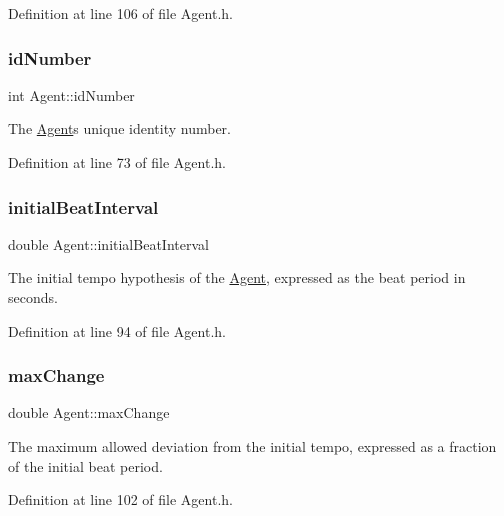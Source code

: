 Definition at line 106 of file Agent.\+h.

\mbox{\label{class_agent_ac857e9fc1a2d40aa8c488c2b0892f796}} 
\subsubsection{\texorpdfstring{id\+Number}{idNumber}}
{\footnotesize\ttfamily int Agent\+::id\+Number}

The \hyperlink{class_agent}{Agent}\textquotesingle{}s unique identity number. 

Definition at line 73 of file Agent.\+h.

\mbox{\label{class_agent_ac6cfc0361e141992752f55ad4b3671d5}} 
\subsubsection{\texorpdfstring{initial\+Beat\+Interval}{initialBeatInterval}}
{\footnotesize\ttfamily double Agent\+::initial\+Beat\+Interval}

The initial tempo hypothesis of the \hyperlink{class_agent}{Agent}, expressed as the beat period in seconds. 

Definition at line 94 of file Agent.\+h.

\mbox{\label{class_agent_a5aa8ad248a3aceecec676b89a0eb3791}} 
\subsubsection{\texorpdfstring{max\+Change}{maxChange}}
{\footnotesize\ttfamily double Agent\+::max\+Change}

The maximum allowed deviation from the initial tempo, expressed as a fraction of the initial beat period. 

Definition at line 102 of file Agent.\+h.

\mbox{\label{class_agent_a6f12ce0139e8709d407fd20963b84d2f}} 
